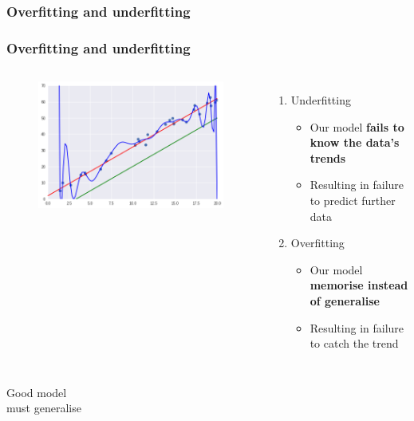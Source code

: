 \documentclass[]{beamer}
\begin{document}
\subsubsection{Overfitting and underfitting}
\begin{frame}
\frametitle{Overfitting and underfitting}
\begin{columns}
\begin{figure}
\includegraphics[scale=.3]{imgs/linreg_2.png}
\end{figure}
\begin{enumerate}
\item<2-> Underfitting
\begin{itemize}
\item<3-> Our model \textbf{fails to know the data's trends}
\item<4-> Resulting in failure to predict further data
\end{itemize}
\item<5-> Overfitting
\begin{itemize}
\item<6-> Our model \textbf{memorise instead of generalise}
\item<7-> Resulting in failure to catch the trend
\end{itemize}
\end{enumerate}
\end{columns}
\end{frame}

\begin{frame}
\begin{center}
{\LARGE Good model}\\
{ \Huge{must generalise}}
\end{center}
\end{frame}
\end{document}
